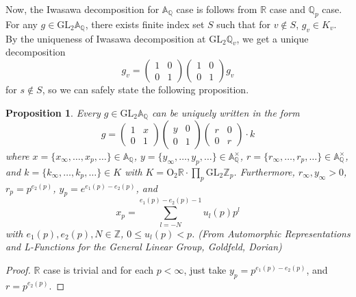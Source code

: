 \documentclass[a4paper, 12pt]{article}
\theoremstyle{Mydefinition}
\theoremstyle{Mytheorem}
\newtheorem{proposition}[statement]{Proposition}
\begin{document}
\begin{enumerate}
    Now, the Iwasawa decomposition for $\mathbb{A}_\mathbb{Q}$ case is follows from $\mathbb{R}$ case and $\mathbb{Q}_p$ case. For any $g\in \mathrm{GL}_2\mathbb{A}_\mathbb{Q}$, there exists finite index set $S$ such that for $v\not\in S$, $g_v \in K_v$. By the uniqueness of Iwasawa decomposition at $\mathrm{GL}_2\mathbb{Q}_v$, we get a unique decomposition
    \begin{equation}
        g_v = \begin{pmatrix}
            1 & 0\\
            0 & 1
        \end{pmatrix}\begin{pmatrix}
            1 & 0\\
            0 & 1
        \end{pmatrix}g_v
    \end{equation}
    for $s\not\in S$, so we can safely state the following proposition.
    \begin{proposition}
    Every $g\in\mathrm{GL}_2\mathbb{A}_\mathbb{Q}$ can be uniquely written in the form
    \begin{equation}
        g=\begin{pmatrix}
            1 & x\\
            0 & 1
        \end{pmatrix}\begin{pmatrix}
            y & 0\\
            0 & 1
        \end{pmatrix}\begin{pmatrix}
            r & 0\\
            0 & r
        \end{pmatrix}\cdot k
    \end{equation}
    where $x=\{x_\infty, \ldots, x_p, \ldots\}\in\mathbb{A}_\mathbb{Q}$, $y=\{y_\infty, \ldots, y_p,\ldots\}\in \mathbb{A}_\mathbb{Q}^\times$, $r=\{r_\infty, \ldots, r_p, \ldots\}\in\mathbb{A}_\mathbb{Q}^\times$, and $k=\{k_\infty, \ldots, k_p,\ldots\}\in K$ with $K=\mathrm{O}_2\mathbb{R}\cdot \prod_{p}\mathrm{GL}_2\mathbb{Z}_p$. Furthermore, $r_\infty, y_\infty>0$, $r_p=p^{e_2(p)}$, $y_p=e^{e_1(p)-e_2(p)}$, and
    \begin{equation}
        x_p = \sum_{l=-N}^{e_1(p)-e_2(p)-1}u_l(p)p^l
    \end{equation}
    with $e_1(p),e_2(p),N\in\mathbb{Z}$, $0\leq u_l(p)<p$. (From \textit{Automorphic Representations and L-Functions for the General Linear Group}, Goldfeld, Dorian)
    \end{proposition}
    \begin{proof}
    $\mathbb{R}$ case is trivial and for each $p<\infty$, just take $y_p = p^{e_1(p)-e_2(p)}$, and $r = p^{e_2(p)}$.
    \end{proof}
\end{enumerate}
\end{document}
